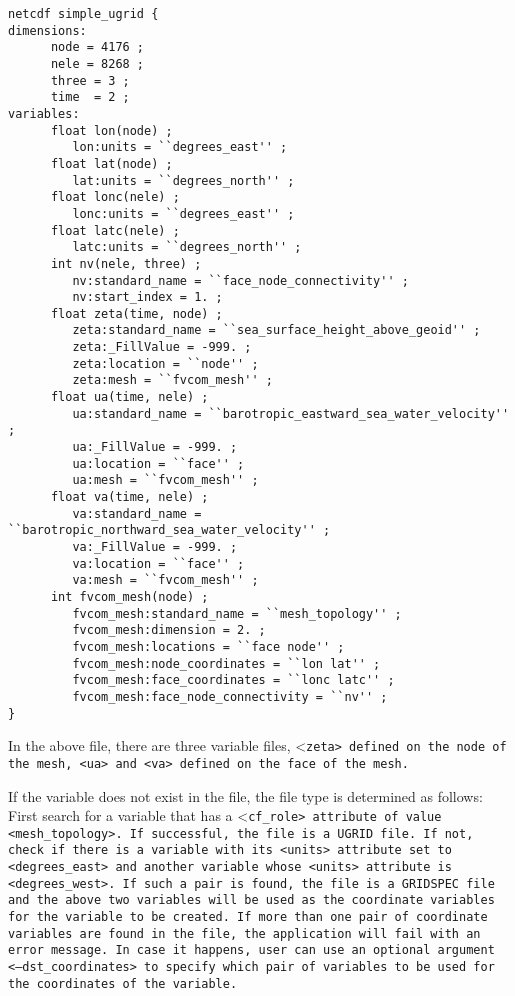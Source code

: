 \label{ugridexample}
\begin{verbatim}
netcdf simple_ugrid {
dimensions:
      node = 4176 ; 
      nele = 8268 ;
      three = 3 ;
      time  = 2 ;
variables:
      float lon(node) ;
         lon:units = ``degrees_east'' ;
      float lat(node) ;
         lat:units = ``degrees_north'' ;
      float lonc(nele) ;
         lonc:units = ``degrees_east'' ;
      float latc(nele) ;
         latc:units = ``degrees_north'' ;
      int nv(nele, three) ;
         nv:standard_name = ``face_node_connectivity'' ;
         nv:start_index = 1. ;
      float zeta(time, node) ;
         zeta:standard_name = ``sea_surface_height_above_geoid'' ;
         zeta:_FillValue = -999. ;
         zeta:location = ``node'' ;
         zeta:mesh = ``fvcom_mesh'' ;
      float ua(time, nele) ;
         ua:standard_name = ``barotropic_eastward_sea_water_velocity'' ;
         ua:_FillValue = -999. ;
         ua:location = ``face'' ;
         ua:mesh = ``fvcom_mesh'' ;
      float va(time, nele) ;
         va:standard_name = ``barotropic_northward_sea_water_velocity'' ;
         va:_FillValue = -999. ;
         va:location = ``face'' ;
         va:mesh = ``fvcom_mesh'' ;
      int fvcom_mesh(node) ;
         fvcom_mesh:standard_name = ``mesh_topology'' ;
         fvcom_mesh:dimension = 2. ;
         fvcom_mesh:locations = ``face node'' ;
         fvcom_mesh:node_coordinates = ``lon lat'' ;
         fvcom_mesh:face_coordinates = ``lonc latc'' ;
         fvcom_mesh:face_node_connectivity = ``nv'' ;
}
\end{verbatim}

In the above file, there are three variable files, <\tt zeta> defined on the node of the mesh, <\tt ua> and
<\tt va> defined on the face of the mesh.  

If the variable does not exist in the file, the file type is determined as follows:  
First search for a variable that has a <\tt cf\_role> attribute of value <\tt mesh\_topology>.  If successful,
the file is a UGRID file.  If not, check if there is a variable with its <\tt units> attribute set to <\tt degrees\_east> and another variable whose <\tt units> attribute is <\tt degrees\_west>.  If such a pair is found, 
the file is a GRIDSPEC file and the above two variables will be used as the coordinate variables for the 
variable to be created.  If more than one pair of coordinate variables are found in the file, the application 
will fail with an error message.  In case it happens, user can use an optional argument 
<\tt --dst\_coordinates> to specify which pair of variables to be used for the coordinates of the variable.

